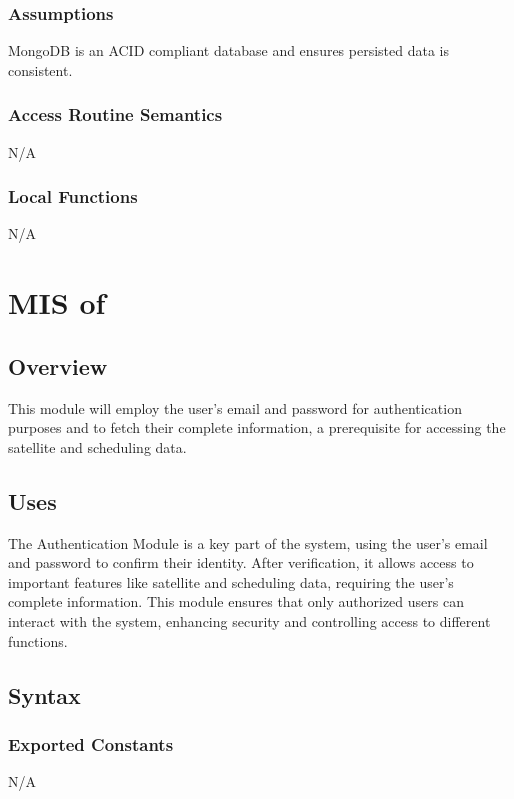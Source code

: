 \documentclass[12pt, titlepage]{article}
\begin{document}
\subsubsection{Assumptions}

MongoDB is an ACID compliant database and ensures persisted data is consistent.

\subsubsection{Access Routine Semantics}

N/A



\subsubsection{Local Functions}

N/A

\section{MIS of } \label{Module} 



\subsection{Overview}
This module will employ the user’s email and password for authentication purposes and to fetch their complete information, a prerequisite for accessing the satellite and scheduling data.

\subsection{Uses}
The Authentication Module is a key part of the system, using the user's email and password to confirm their identity. After verification, it allows access to important features like satellite and scheduling data, requiring the user's complete information. This module ensures that only authorized users can interact with the system, enhancing security and controlling access to different functions.


\subsection{Syntax}

\subsubsection{Exported Constants}
N/A
\end{document}
